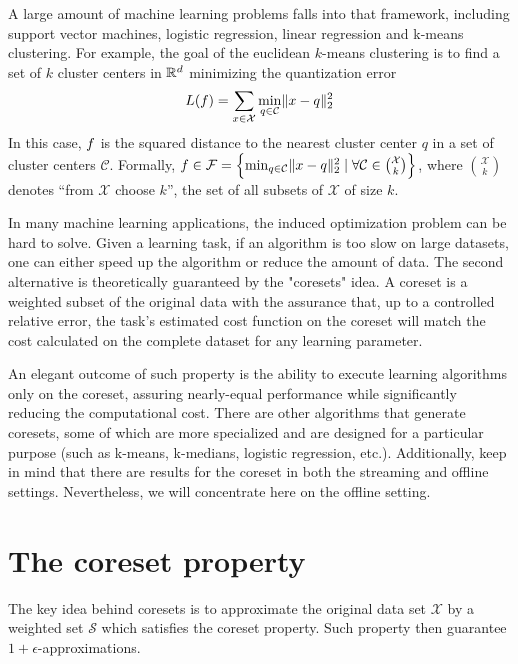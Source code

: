 A large amount of machine learning problems falls into that framework, including support vector machines, logistic regression, linear regression and k-means clustering. For example, the goal of the euclidean $k$-means clustering is to find a set of $k$ cluster centers in $\mathbb{R}^d$ minimizing the quantization error
\begin{equation*}
L(f ) = \sum_{x \in \mathcal{X}} \min_{q \in \mathcal{C} } \lVert x - q \rVert^2_2
\end{equation*}
In this case, $f$ is the squared distance to the nearest cluster center $q$ in a set of cluster centers $\mathcal{C}$. Formally, $f  \in \mathcal{F} = \left\{\min_{q \in \mathcal{C} } \lVert x - q \rVert^2_2 \mid \forall \mathcal{C}  \in \binom{\mathcal{X}}{k}\right\}  $, where $\binom{\mathcal{X}}{k}$ denotes ``from $\mathcal{X}$ choose $k$'', the set of all subsets of $\mathcal{X}$ of size $k$.

In many machine learning applications, the induced optimization problem can be hard to solve. Given a learning task, if an algorithm is too slow on large datasets, one can either speed up the algorithm or reduce the amount of data.
The second alternative is theoretically guaranteed by the "coresets" idea.
A coreset is a weighted subset of the original data with the assurance that, up to a controlled relative error, the task's estimated cost function on the coreset will match the cost calculated on the complete dataset for any learning parameter.

An elegant outcome of such property is the ability to execute learning algorithms only on the coreset, assuring nearly-equal performance while significantly reducing the computational cost. There are other algorithms that generate coresets, some of which are more specialized and are designed for a particular purpose (such as k-means, k-medians, logistic regression, etc.). Additionally, keep in mind that there are results for the coreset in both the streaming and offline settings. Nevertheless, we will concentrate here on the offline setting.


\section{The coreset property}

The key idea behind coresets is to approximate the original data
set $\mathcal{X}$ by a weighted set $\mathcal{S}$ which satisfies the coreset property. Such property then guarantee $1+\epsilon$-approximations.

